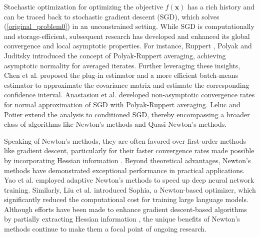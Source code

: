 \documentclass[aos]{imsart}
\numberwithin{equation}{section}
\theoremstyle{plain}
\begin{document}
Stochastic optimization for optimizing the objective $f(\bm{x})$ has a rich history and can be traced back to stochastic gradient descent (SGD), which solves (\ref{original_problem0}) in an unconstrained setting. 
While SGD is computationally and storage-efficient, subsequent research has developed and enhanced its global convergence and local asymptotic properties.
For instance, Ruppert \cite{ruppert1988efficient}, Polyak and Juditsky\cite{polyak1992acceleration} introduced the concept of Polyak-Ruppert averaging, achieving asymptotic normality for averaged iterates.
Further leveraging these insights, Chen et al. \cite{chen2020statistical} proposed the plug-in estimator and a more efficient batch-means estimator to approximate the covariance matrix and estimate the corresponding confidence interval. 
Anastasiou et al. \cite{anastasiou2019normal} developed non-asymptotic convergence rates for normal approximation of SGD with Polyak-Ruppert averaging. 
Leluc and Potier \cite{leluc2020asymptotic} extend the analysis to conditioned SGD, thereby encompassing a broader class of algorithms like Newton's methods and Quasi-Newton's methods.


Speaking of Newton's methods, they are often favored over first-order methods like gradient descent, particularly for their faster convergence rates made possible by incorporating Hessian information \cite{jorge2006numerical, na2022hessian, yue2019quadratic}.
Beyond theoretical advantages, Newton's methods have demonstrated exceptional performance in practical applications. Yao et al. \cite{yao2021adahessian} employed adaptive Newton's methods to speed up deep neural network training. Similarly, Liu et al. \cite{liu2023sophia} introduced Sophia, a Newton-based optimizer, which significantly reduced the computational cost for training large language models. 
Although efforts have been made to enhance gradient descent-based algorithms by partially extracting Hessian information \cite{carmon2017convex, carmon2018accelerated, allen2018make}, the unique benefits of Newton's methods continue to make them a focal point of ongoing research.
\end{document}

